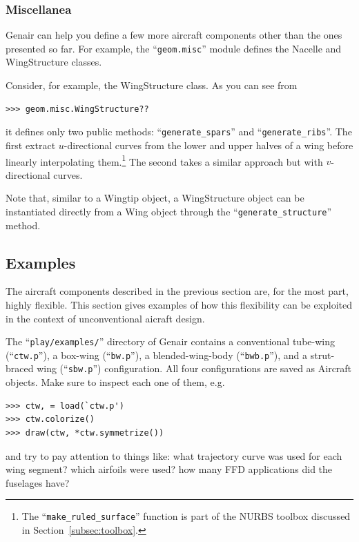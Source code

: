 \documentclass[]{article}
\begin{document}
\subsubsection{Miscellanea}
\label{subsubsec:misc}

Genair can help you define a few more aircraft components other than the 
ones presented so far.  For example, the ``\texttt{geom.misc}'' module 
defines the Nacelle and WingStructure classes.

Consider, for example, the WingStructure class.  As you can see from
\begin{verbatim}
>>> geom.misc.WingStructure??
\end{verbatim}
it defines only two public methods: ``\texttt{generate\_spars}'' and 
``\texttt{generate\_ribs}''.  The first extract $u$-directional curves 
from the lower and upper halves of a wing before linearly interpolating 
them.\footnote{The ``\texttt{make\_ruled\_surface}'' function is part of 
the NURBS toolbox discussed in Section~\ref{subsec:toolbox}.}  The 
second takes a similar approach but with $v$-directional curves.

Note that, similar to a Wingtip object, a WingStructure object can be 
instantiated directly from a Wing object through the 
``\texttt{generate\_structure}'' method.

\subsection{Examples}
\label{subsec:examples}

The aircraft components described in the previous section are, for the 
most part, highly flexible.  This section gives examples of how this 
flexibility can be exploited in the context of unconventional aicraft 
design.

The ``\texttt{play/examples/}'' directory of Genair contains a 
conventional tube-wing (``\texttt{ctw.p}''), a box-wing 
(``\texttt{bw.p}''), a blended-wing-body (``\texttt{bwb.p}''), and a 
strut-braced wing (``\texttt{sbw.p}'') configuration.  All four 
configurations are saved as Aircraft objects.  Make sure to inspect each 
one of them, e.g.
\begin{verbatim}
>>> ctw, = load(`ctw.p')
>>> ctw.colorize()
>>> draw(ctw, *ctw.symmetrize())
\end{verbatim}
and try to pay attention to things like: what trajectory curve was used 
for each wing segment?  which airfoils were used?  how many FFD 
applications did the fuselages have?
\end{document}
